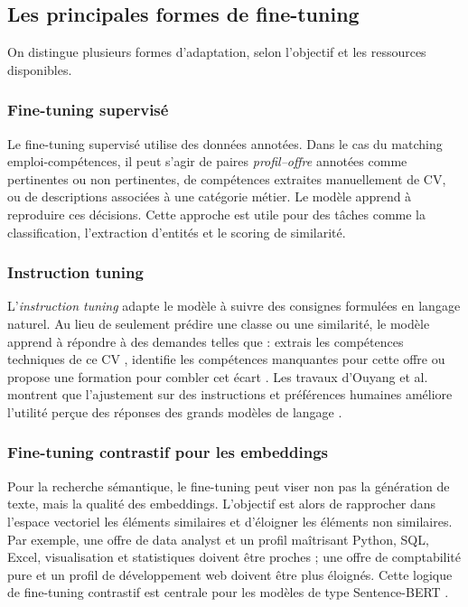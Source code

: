 \documentclass[12pt,twoside]{report}
\begin{document}
\subsection{Les principales formes de fine-tuning}
On distingue plusieurs formes d'adaptation, selon l'objectif et les ressources disponibles.

\subsubsection{Fine-tuning supervisé}
Le fine-tuning supervisé utilise des données annotées. Dans le cas du matching emploi-compétences, il peut s'agir de paires \textit{profil--offre} annotées comme pertinentes ou non pertinentes, de compétences extraites manuellement de CV, ou de descriptions associées à une catégorie métier. Le modèle apprend à reproduire ces décisions. Cette approche est utile pour des tâches comme la classification, l'extraction d'entités et le scoring de similarité.

\subsubsection{Instruction tuning}
L'\emph{instruction tuning} adapte le modèle à suivre des consignes formulées en langage naturel. Au lieu de seulement prédire une classe ou une similarité, le modèle apprend à répondre à des demandes telles que : \og extrais les compétences techniques de ce CV \fg{}, \og identifie les compétences manquantes pour cette offre \fg{} ou \og propose une formation pour combler cet écart \fg{}. Les travaux d'Ouyang et al. montrent que l'ajustement sur des instructions et préférences humaines améliore l'utilité perçue des réponses des grands modèles de langage \cite{ouyang2022training}.

\subsubsection{Fine-tuning contrastif pour les embeddings}
Pour la recherche sémantique, le fine-tuning peut viser non pas la génération de texte, mais la qualité des embeddings. L'objectif est alors de rapprocher dans l'espace vectoriel les éléments similaires et d'éloigner les éléments non similaires. Par exemple, une offre de \og data analyst \fg{} et un profil maîtrisant Python, SQL, Excel, visualisation et statistiques doivent être proches ; une offre de comptabilité pure et un profil de développement web doivent être plus éloignés. Cette logique de fine-tuning contrastif est centrale pour les modèles de type Sentence-BERT \cite{reimers2019sbert}.
\end{document}
